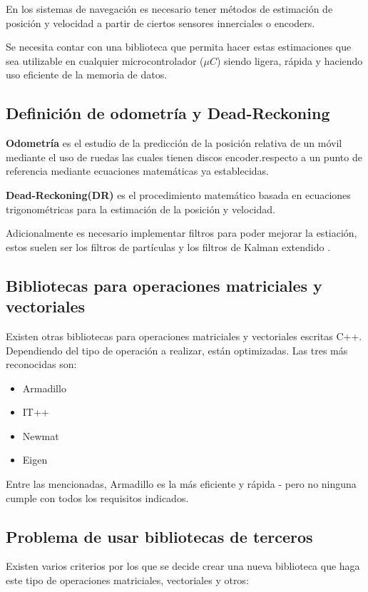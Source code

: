 \documentclass[main.tex]{subfiles}
\begin{document}

En los sistemas de navegación es necesario tener métodos
de estimación de posición y velocidad a partir de ciertos
sensores innerciales o encoders.

Se necesita contar con una biblioteca que permita hacer estas
estimaciones que sea utilizable en cualquier microcontrolador
(${\mu}C$) siendo ligera, rápida y haciendo uso eficiente de la
memoria de datos.

\subsection{Definición de odometría y Dead-Reckoning}
\textbf{Odometría} es el estudio de la predicción de la posición
relativa de un móvil mediante el uso de ruedas las cuales
tienen discos encoder.respecto a un punto de referencia mediante
ecuaciones matemáticas ya establecidas.

\textbf{Dead-Reckoning(DR)} es el procedimiento matemático basada
en ecuaciones trigonométricas para la estimación de la posición
y velocidad.

Adicionalmente es necesario implementar filtros para poder mejorar
la estiación, estos suelen ser los filtros de partículas y los
filtros de Kalman extendido \cite{DR:kalman_missing}.

\subsection{Bibliotecas para operaciones matriciales y vectoriales}
Existen otras bibliotecas para operaciones matriciales y vectoriales
escritas C++. Dependiendo del tipo de operación a realizar, están
optimizadas. Las tres más reconocidas son:

\begin{itemize}
\item Armadillo
\item IT++
\item Newmat
\item Eigen
\end{itemize}

Entre las mencionadas, Armadillo es la más eficiente y rápida
\cite{LibSpeedweb:Armadillo}-\cite{LibCompare} pero no ninguna
cumple con todos los requisitos indicados.

\subsection{Problema de usar bibliotecas de terceros}
Existen varios criterios por los que se decide crear una nueva
biblioteca que haga este tipo de operaciones matriciales,
vectoriales y otros:
\end{document}
